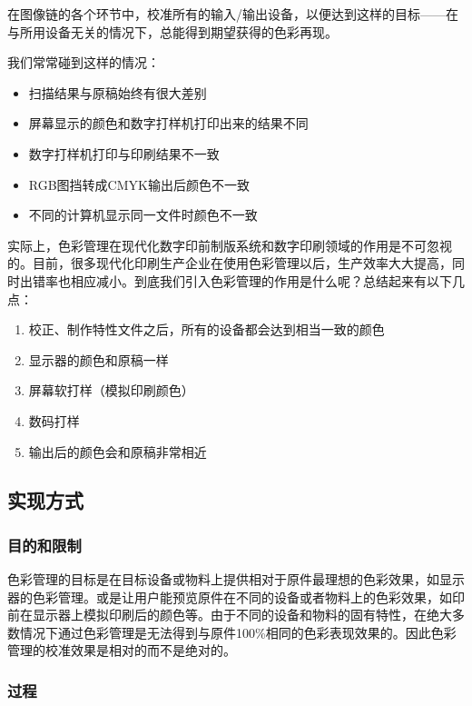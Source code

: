     在图像链的各个环节中，校准所有的输入/输出设备，以便达到这样的目标——在与所用设备无关的情况下，总能得到期望获得的色彩再现。

    我们常常碰到这样的情况：
    \begin{itemize}
        \item  扫描结果与原稿始终有很大差别
        \item  屏幕显示的颜色和数字打样机打印出来的结果不同
        \item  数字打样机打印与印刷结果不一致
        \item  RGB图挡转成CMYK输出后颜色不一致
        \item  不同的计算机显示同一文件时颜色不一致
    \end{itemize}

    实际上，色彩管理在现代化数字印前制版系统和数字印刷领域的作用是不可忽视的。目前，很多现代化印刷生产企业在使用色彩管理以后，生产效率大大提高，同时出错率也相应减小。到底我们引入色彩管理的作用是什么呢？总结起来有以下几点：

    \begin{enumerate}
        \item  校正、制作特性文件之后，所有的设备都会达到相当一致的颜色
        \item  显示器的颜色和原稿一样
        \item  屏幕软打样（模拟印刷颜色）
        \item  数码打样
        \item  输出后的颜色会和原稿非常相近
    \end{enumerate}

\subsection {实现方式}

    \subsubsection {目的和限制}

        色彩管理的目标是在目标设备或物料上提供相对于原件最理想的色彩效果，如显示器的色彩管理。或是让用户能预览原件在不同的设备或者物料上的色彩效果，如印前在显示器上模拟印刷后的颜色等。由于不同的设备和物料的固有特性，在绝大多数情况下通过色彩管理是无法得到与原件100\%相同的色彩表现效果的。因此色彩管理的校准效果是相对的而不是绝对的。

    \subsubsection {过程}


